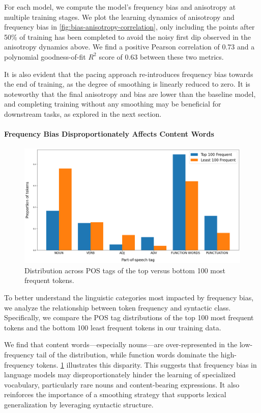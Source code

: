 For each model, we compute the model's frequency bias and anisotropy at multiple training stages. We plot the learning dynamics of anisotropy and frequency bias in \cref{fig:bias-anisotropy-correlation}, only including the points after 50\% of training has been completed to avoid the noisy first dip observed in the anisotropy dynamics above. We find a positive Pearson correlation of 0.73 and a polynomial goodness-of-fit $R^2$ score of 0.63 between these two metrics.

It is also evident that the pacing approach re-introduces frequency bias towards the end of training, as the degree of smoothing is linearly reduced to zero. It is noteworthy that the final anisotropy and bias are lower than the baseline model, and completing training without any smoothing may be beneficial for downstream tasks, as explored in the next section.

\paragraph{Frequency Bias Disproportionately Affects Content Words}
\label{section:word-class-versus-word-frequency}

\begin{figure}[ht!]
    \centering
    \includegraphics[width=0.65\linewidth]{chapters/syntatic-smoothing/figures/top_versus_bottom_pos_dist.png}
    \caption{Distribution across POS tags of the top versus bottom 100 most frequent tokens.}
    \label{fig:top-100-pos-dist}
\end{figure}

To better understand the linguistic categories most impacted by frequency bias, we analyze the relationship between token frequency and syntactic class. Specifically, we compare the POS tag distributions of the top 100 most frequent tokens and the bottom 100 least frequent tokens in our training data. 

We find that content words—especially nouns—are over-represented in the low-frequency tail of the distribution, while function words dominate the high-frequency tokens. \cref{fig:top-100-pos-dist} illustrates this disparity. This suggests that frequency bias in language models may disproportionately hinder the learning of specialized vocabulary, particularly rare nouns and content-bearing expressions. It also reinforces the importance of a smoothing strategy that supports lexical generalization by leveraging syntactic structure.


